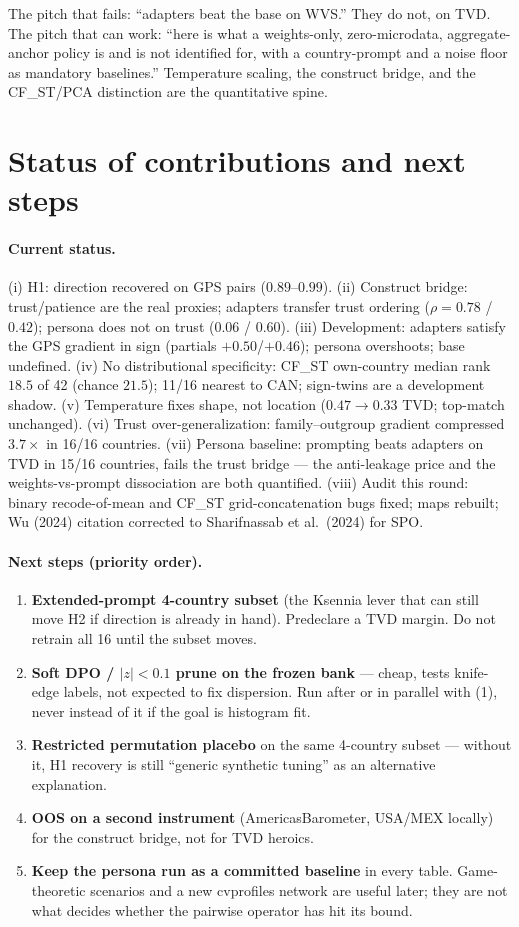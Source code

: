 \documentclass[11pt]{article}
\begin{document}
The pitch that fails: ``adapters beat the base on WVS.'' They do not, on TVD. The pitch that can work: ``here is what a weights-only, zero-microdata, aggregate-anchor policy is and is not identified for, with a country-prompt and a noise floor as mandatory baselines.'' Temperature scaling, the construct bridge, and the CF\_ST/PCA distinction are the quantitative spine.

\section{Status of contributions and next steps}
\label{sec:next}
\paragraph{Current status.}
(i) H1: direction recovered on GPS pairs ($0.89$--$0.99$). (ii) Construct bridge: trust/patience are the real proxies; adapters transfer trust ordering ($\rho=0.78$ / $0.42$); persona does not on trust ($0.06$ / $0.60$). (iii) Development: adapters satisfy the GPS gradient in sign (partials $+0.50$/$+0.46$); persona overshoots; base undefined. (iv) No distributional specificity: CF\_ST own-country median rank $18.5$ of 42 (chance $21.5$); 11/16 nearest to CAN; sign-twins are a development shadow. (v) Temperature fixes shape, not location ($0.47\to 0.33$ TVD; top-match unchanged). (vi) Trust over-generalization: family--outgroup gradient compressed $3.7\times$ in 16/16 countries. (vii) Persona baseline: prompting beats adapters on TVD in 15/16 countries, fails the trust bridge --- the anti-leakage price and the weights-vs-prompt dissociation are both quantified. (viii) Audit this round: binary recode-of-mean and CF\_ST grid-concatenation bugs fixed; maps rebuilt; Wu (2024) citation corrected to Sharifnassab et al.\ (2024) for SPO.

\paragraph{Next steps (priority order).}
\begin{enumerate}
\item \textbf{Extended-prompt 4-country subset} (the Ksennia lever that can still move H2 if direction is already in hand). Predeclare a TVD margin. Do not retrain all 16 until the subset moves.
\item \textbf{Soft DPO / $|z|<0.1$ prune on the frozen bank} --- cheap, tests knife-edge labels, not expected to fix dispersion. Run after or in parallel with (1), never instead of it if the goal is histogram fit.
\item \textbf{Restricted permutation placebo} on the same 4-country subset --- without it, H1 recovery is still ``generic synthetic tuning'' as an alternative explanation.
\item \textbf{OOS on a second instrument} (AmericasBarometer, USA/MEX locally) for the construct bridge, not for TVD heroics.
\item \textbf{Keep the persona run as a committed baseline} in every table. Game-theoretic scenarios and a new cvprofiles network are useful later; they are not what decides whether the pairwise operator has hit its bound.
\end{enumerate}
\end{document}

